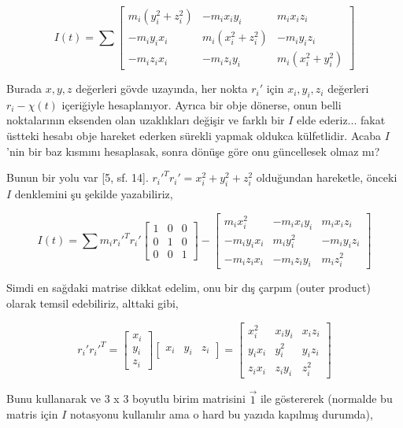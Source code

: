 \documentclass[12pt,fleqn]{article}\usepackage{../../common}
\begin{document}
$$
I(t) = \sum \left[\begin{array}{ccc}
m_i (y_i^2 + z_i^2) & -m_i x_i y_i & m_i x_i z_i \\
-m_i y_i x_i & m_i (x_i^2 + z_i^2) & -m_i y_i z_i \\
-m_i z_i x_i & -m_i z_i y_i & m_i (x_i^2 + y_i^2)
\end{array}\right]
$$

Burada $x,y,z$ değerleri gövde uzayında, her nokta $r_i'$ için $x_i,y_i,z_i$
değerleri $r_i - \chi(t)$ içeriğiyle hesaplanıyor. Ayrıca bir obje dönerse, onun
belli noktalarının eksenden olan uzaklıkları değişir ve farklı bir $I$ elde
ederiz... fakat üstteki hesabı obje hareket ederken sürekli yapmak oldukca
külfetlidir. Acaba $I$'nin bir baz kısmını hesaplasak, sonra dönüşe göre onu
güncellesek olmaz mı?

Bunun bir yolu var [5, sf. 14]. $r_i'^T r_i' = x_i^2 + y_i^2 + z_i^2$ olduğundan
hareketle, önceki $I$ denklemini şu şekilde yazabiliriz,

$$
I(t) = \sum
m_i r_i'^T r_i' \left[\begin{array}{ccc}
1 & 0 & 0 \\ 
0 & 1 & 0 \\ 
0 & 0 & 1 
\end{array}\right] -
\left[\begin{array}{ccc}
m_i x_i^2 & -m_i x_i y_i & m_i x_i z_i \\
-m_i y_i x_i & m_i y_i^2 & -m_i y_i z_i \\
-m_i z_i x_i & -m_i z_i y_i & m_i z_i^2
\end{array}\right]
$$

Simdi en sağdaki matrise dikkat edelim, onu bir dış çarpım (outer product)
olarak temsil edebiliriz, alttaki gibi,

$$
r_i' r_i'^T = \left[\begin{array}{c}
x_i \\ y_i \\ z_i
\end{array}\right]
\left[\begin{array}{ccc}
x_i & y_i & z_i
\end{array}\right] =
\left[\begin{array}{ccc}
x_i^2 &  x_i y_i &  x_i z_i \\
y_i x_i & y_i^2 & y_i z_i \\
z_i x_i & z_i y_i & z_i^2
\end{array}\right]
$$

Bunu kullanarak ve 3 x 3 boyutlu birim matrisini $\vec{1}$ ile göstererek
(normalde bu matris için $I$ notasyonu kullanılır ama o hard bu yazıda
kapılmış durumda),
\end{document}
